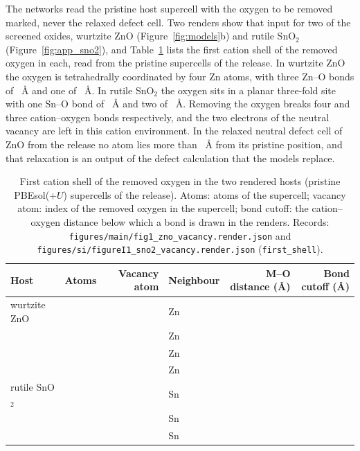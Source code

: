 The networks read the pristine host supercell with the oxygen to be removed marked, never the relaxed defect cell. Two renders show that input for two of the screened oxides, wurtzite ZnO (Figure~\ref{fig:models}b) and rutile SnO$_2$ (Figure~\ref{fig:app_sno2}), and Table~\ref{tab:app_shell} lists the first cation shell of the removed oxygen in each, read from the pristine supercells of the release. In wurtzite ZnO the oxygen is tetrahedrally coordinated by four Zn atoms, with three Zn--O bonds of \numRenderZnOFirstShellSeventyFiveDistanceA{}~\AA{} and one of \numRenderZnOFirstShellZeroDistanceA{}~\AA{}. In rutile SnO$_2$ the oxygen sits in a planar three-fold site with one Sn--O bond of \numRenderSnOTwoFirstShellZeroDistanceA{}~\AA{} and two of \numRenderSnOTwoFirstShellEighteenDistanceA{}~\AA{}. Removing the oxygen breaks four and three cation--oxygen bonds respectively, and the two electrons of the neutral vacancy are left in this cation environment. In the relaxed neutral defect cell of ZnO from the release no atom lies more than \numStructureAuditZnoPristineVsRelaxedDisplacementAMaxOfMatchedAtoms{}~\AA{} from its pristine position, and that relaxation is an output of the defect calculation that the models replace.

\begin{table}[H]
\caption{First cation shell of the removed oxygen in the two rendered hosts (pristine PBEsol(+$U$) supercells of the release). Atoms: atoms of the supercell; vacancy atom: index of the removed oxygen in the supercell; bond cutoff: the cation--oxygen distance below which a bond is drawn in the renders. Records: \texttt{figures/main/fig1\_zno\_vacancy.render.json} and \texttt{figures/si/figureI1\_sno2\_vacancy.render.json} (\texttt{first\_shell}).\label{tab:app_shell}}
\centering
\small
\begin{tabular}{lrrlrr}
\toprule
Host & Atoms & Vacancy atom & Neighbour & M--O distance (\AA) & Bond cutoff (\AA) \\
\midrule
wurtzite ZnO & \numRenderZnONAtoms{} & \numRenderZnOVacancyAtomIndex{} & Zn & \numRenderZnOFirstShellSeventyFiveDistanceA{} & \numRenderZnOCationOBondCutoffAZn{} \\
 & & & Zn & \numRenderZnOFirstShellSeventyEightDistanceA{} & \\
 & & & Zn & \numRenderZnOFirstShellOneHundredThirtyFiveDistanceA{} & \\
 & & & Zn & \numRenderZnOFirstShellZeroDistanceA{} & \\
\addlinespace
rutile SnO$_2$ & \numRenderSnOTwoNAtoms{} & \numRenderSnOTwoVacancyAtomIndex{} & Sn & \numRenderSnOTwoFirstShellZeroDistanceA{} & \numRenderSnOTwoCationOBondCutoffASn{} \\
 & & & Sn & \numRenderSnOTwoFirstShellNineteenDistanceA{} & \\
 & & & Sn & \numRenderSnOTwoFirstShellEighteenDistanceA{} & \\
\bottomrule
\end{tabular}
\end{table}


